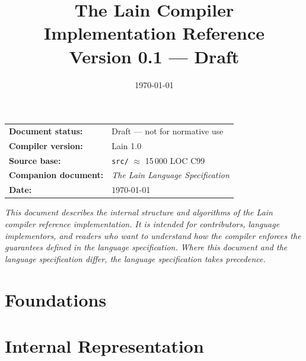 \documentclass[11pt,a4paper,twoside,openright]{book}
\title{%
  \vspace{-2cm}
  {\LARGE\bfseries\color{lain-blue} The Lain Compiler}\\[0.8em]
  {\large Implementation Reference}\\[0.4em]
  {\normalsize Version 0.1 --- Draft}
}
\author{}
\date{\today}
\begin{document}

\frontmatter

\maketitle
\thispagestyle{empty}

\vfill
\noindent
\begin{tabular}{ll}
  \textbf{Document status:}    & Draft --- not for normative use \\
  \textbf{Compiler version:}   & Lain 1.0 \\
  \textbf{Source base:}        & \texttt{src/} $\approx$ 15\,000 LOC C99 \\
  \textbf{Companion document:} & \textit{The Lain Language Specification} \\
  \textbf{Date:}               & \today \\
\end{tabular}
\vfill
\noindent\textit{%
  This document describes the internal structure and algorithms of the Lain
  compiler reference implementation.  It is intended for contributors,
  language implementors, and readers who want to understand \emph{how}
  the compiler enforces the guarantees defined in the language specification.
  Where this document and the language specification differ, the language
  specification takes precedence.
}
\clearpage

\tableofcontents
\clearpage

\mainmatter

\part{Foundations}




\part{Internal Representation}


\end{document}
